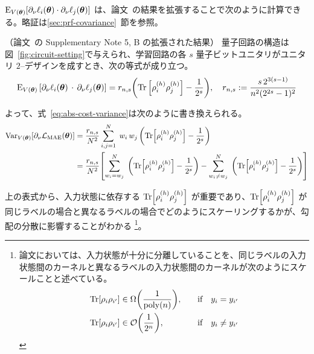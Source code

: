 $\operatorname{E}_{V(\boldsymbol{\theta})}[\partial_\nu\ell_i(\boldsymbol{\theta})\cdot\partial_\nu\ell_j(\boldsymbol{\theta})]$ は、論文~\cite{cerezo2021cost}の結果を拡張することで次のように計算できる。略証は\ref{sec:prf-covariance}~節を参照。
\begin{screen}
    \begin{corollary}\label{cor:covariance}
        （論文~\cite{cerezo2021cost}の Supplementary Note 5, B の拡張された結果）
        量子回路の構造は図~\ref{fig:circuit-setting}で与えられ、学習回路の各 $s$ 量子ビットユニタリがユニタリ $2$--デザインを成すとき、次の等式が成り立つ。
        \begin{align}
            \operatorname{E}_{V(\boldsymbol{\theta})}\qty[\partial_\nu\ell_i(\boldsymbol{\theta})\,\cdot\,\partial_\nu\ell_j(\boldsymbol{\theta})] = r_{n,s}\qty(\Tr\qty[\rho_i^{(h)}\rho_j^{(h)}]-\frac{1}{2^s}),
            \quad r_{n,s} := \frac{s\,2^{3(s-1)}}{n^2(2^{2s}-1)^2}
        \end{align}
    \end{corollary}
\end{screen}

よって、式~\eqref{eq:abs-cost-variance}は次のように書き換えられる。
\begin{align}\label{eq:abs-cost-variance-2}
    \operatorname{Var}_{V(\boldsymbol{\theta})}[\partial_\nu\mathcal{L}_{\mathrm{MAE}}(\boldsymbol{\theta})]
    &= \frac{r_{n,s}}{N^2}
    \sum_{i,j=1}^N\; w_i\, w_j\,
    \qty(\Tr[\rho_i^{(h)}\rho_j^{(h)}]-\frac{1}{2^s})\\
    &=
    \frac{r_{n,s}}{N^2}
    \qty[
        \sum_{w_i=w_j}^N\;
        \qty(\Tr[\rho_i^{(h)}\rho_j^{(h)}]-\frac{1}{2^s})
        -
        \sum_{w_i\neq w_j}^N\;
        \qty(\Tr[\rho_i^{(h)}\rho_j^{(h)}]-\frac{1}{2^s})
    ]
\end{align}

上の表式から、入力状態に依存する $\Tr[\rho_i^{(h)}\rho_j^{(h)}]$ が重要であり、$\Tr[\rho_i^{(h)}\rho_j^{(h)}]$ が同じラベルの場合と異なるラベルの場合でどのようにスケーリングするかが、勾配の分散に影響することがわかる
\footnote{
論文\cite{garcia-martin2023deep}においては、入力状態が十分に分離していることを、同じラベルの入力状態間のカーネルと異なるラベルの入力状態間のカーネルが次のようにスケールことと述べている。
\begin{alignat*}{2}
    \Tr[\rho_i \rho_{i^{\prime}}] &\in \Omega\qty(\frac{1}{\mathrm{poly}(n)}), \quad&\text{if} \quad y_i=y_{i^{\prime}} \\
    \Tr[\rho_i \rho_{i^{\prime}}] &\in \mathcal{O}\qty(\frac{1}{2^n}), \quad&\text{if} \quad y_i \neq y_{i^{\prime}}
\end{alignat*}
}。

